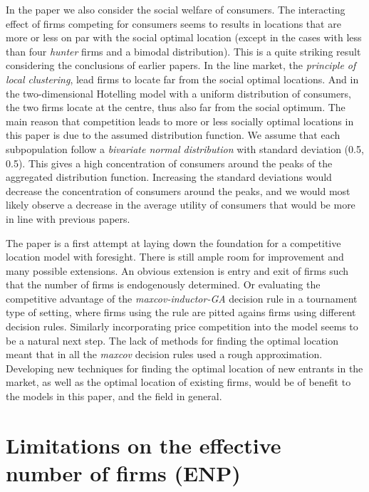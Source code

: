\documentclass[preprint, 12pt]{elsarticle}
\begin{document}
In the paper we also consider the social welfare of consumers. The interacting effect of firms competing for consumers seems to results in locations that are more or less on par with the social optimal location (except in the cases with less than four \emph{hunter} firms and a bimodal distribution). This is a quite striking result considering the conclusions of earlier papers. In the line market, the \emph{principle of local clustering}, lead firms to locate far from the social optimal locations. And in the two-dimensional Hotelling model with a uniform distribution of consumers, the two firms locate at the centre, thus also far from the social optimum. The main reason that competition leads to more or less socially optimal locations in this paper is due to the assumed distribution function. We assume that each subpopulation follow a \emph{bivariate normal distribution} with standard deviation (0.5, 0.5). This gives a high concentration of consumers around the peaks of the aggregated distribution function. Increasing the standard deviations would decrease the concentration of consumers around the peaks, and we would most likely observe a decrease in the average utility of consumers that would be more in line with previous papers. 

The paper is a first attempt at laying down the foundation for a competitive location model with foresight. There is still ample room for improvement and many possible extensions. An obvious extension is entry and exit of firms such that the number of firms is endogenously determined. Or evaluating the competitive advantage of the \emph{maxcov-inductor-GA} decision rule in a tournament type of setting, where firms using the rule are pitted agains firms using different decision rules. Similarly incorporating price competition into the model seems to be a natural next step. The lack of methods for finding the optimal location meant that in all the \emph{maxcov} decision rules used a rough approximation. Developing new techniques for finding the optimal location of new entrants in the market, as well as the optimal location of existing firms, would be of benefit to the models in this paper, and the field in general.


\newpage
\begingroup
\appendix

\section{Limitations on the effective number of firms (ENP)}
\label{app:ENP}
\end{document}
